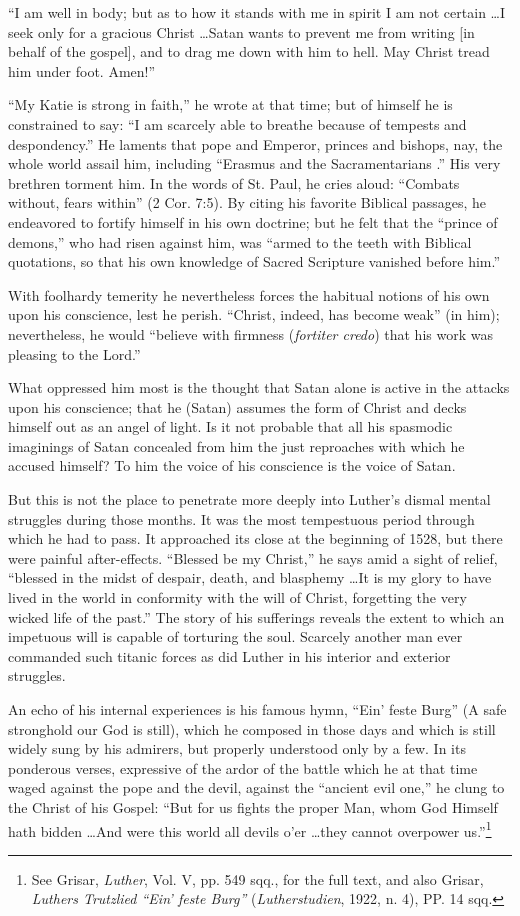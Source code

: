“I am well in body; but as to how it stands with me in spirit I am not
certain \dots I seek only for a gracious Christ \dots Satan wants to prevent
me from writing [in behalf of the gospel], and to drag me down with him
to hell. May Christ tread him under foot. Amen!”

“My Katie is strong in faith,” he wrote at that time; but of himself he is
constrained to say: “I am scarcely able to breathe because of tempests and
despondency.” He laments that pope and Emperor, princes and bishops,
nay, the whole world assail him, including “Erasmus and the Sacramentarians
.” His very brethren torment him. In the words of St. Paul, he cries
aloud: “Combats without, fears within” (2 Cor. 7:5). By citing his
favorite Biblical passages, he endeavored to fortify himself in his own doctrine;
but he felt that the “prince of demons,” who had risen against him,
was “armed to the teeth with Biblical quotations, so that his own knowledge
of Sacred Scripture vanished before him.”

With foolhardy temerity he nevertheless forces the habitual notions of
his own upon his conscience, lest he perish. “Christ, indeed, has become
weak” (in him); nevertheless, he would “believe with firmness (\textit{fortiter
credo}) that his work was pleasing to the Lord.”

What oppressed him most is the thought that Satan alone is
active in the attacks upon his conscience; that he (Satan) assumes
the form of Christ and decks himself out as an angel of light. Is it
not probable that all his spasmodic imaginings of Satan concealed
from him the just reproaches with which he accused himself? To
him the voice of his conscience is the voice of Satan.

But this is not the place to penetrate more deeply into Luther’s
dismal mental struggles during those months. It was the most tempestuous
period through which he had to pass. It approached its close
at the beginning of 1528, but there were painful after-effects.
“Blessed be my Christ,” he says amid a sight of relief, “blessed in the
midst of despair, death, and blasphemy \dots It is my glory to have
lived in the world in conformity with the will of Christ, forgetting
the very wicked life of the past.” The story of his sufferings reveals
the extent to which an impetuous will is capable of torturing the
soul. Scarcely another man ever commanded such titanic forces as
did Luther in his interior and exterior struggles.

An echo of his internal experiences is his famous hymn, “Ein’
feste Burg” (A safe stronghold our God is still), which he composed
in those days and which is still widely sung by his admirers, but
properly understood only by a few. In its ponderous verses, expressive
of the ardor of the battle which he at that time waged against the
pope and the devil, against the “ancient evil one,” he clung to the
Christ of his Gospel: “But for us fights the proper Man, whom God
Himself hath bidden \dots And were this world all devils o'er \dots they
cannot overpower us.”\footnote{See Grisar, \textit{Luther}, Vol. V, pp. 549 sqq., for the full text, and also Grisar, \textit{Luthers
Trutzlied “Ein’ feste Burg”} (\textit{Lutherstudien}, 1922, n. 4), PP. 14 sqq.}

